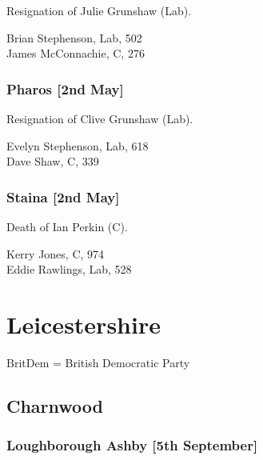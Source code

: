 \documentclass[a4paper,openany,10pt]{book}
\begin{document}

Resignation of Julie Grunshaw (Lab).



Brian Stephenson, Lab, 502\\
James McConnachie, C, 276\\


\subsubsection*{Pharos \hspace*{\fill}\nolinebreak[1]%
\enspace\hspace*{\fill}
[2nd May]}


Resignation of Clive Grunshaw (Lab).



Evelyn Stephenson, Lab, 618\\
Dave Shaw, C, 339\\


\subsubsection*{Staina \hspace*{\fill}\nolinebreak[1]%
\enspace\hspace*{\fill}
[2nd May]}


Death of Ian Perkin (C).



Kerry Jones, C, 974\\
Eddie Rawlings, Lab, 528\\


\vfill

\section[Leicestershire]{{Leicestershire}}

BritDem = British Democratic Party

\subsection*{Charnwood}

\subsubsection*{Loughborough Ashby \hspace*{\fill}\nolinebreak[1]%
\enspace\hspace*{\fill}
[5th September]}
\end{document}
